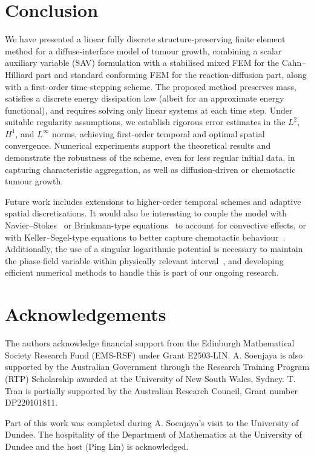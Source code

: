 \documentclass[11pt, reqno]{amsart}
\theoremstyle{definition}
\numberwithin{equation}{section}
\begin{document}
\section{Conclusion}\label{sec:conclusion}

We have presented a linear fully discrete structure-preserving finite element method for a diffuse-interface model of tumour growth, combining a scalar auxiliary variable (SAV) formulation with a stabilised mixed FEM for the Cahn--Hilliard part and standard conforming FEM for the reaction-diffusion part, along with a first-order time-stepping scheme. The proposed method preserves mass, satisfies a discrete energy dissipation law (albeit for an approximate energy functional), and requires solving only linear systems at each time step. Under suitable regularity assumptions, we establish rigorous error estimates in the $L^2$, $H^1$, and $L^\infty$ norms, achieving first-order temporal and optimal spatial convergence. Numerical experiments support the theoretical results and demonstrate the robustness of the scheme, even for less regular initial data, in capturing characteristic aggregation, as well as diffusion-driven or chemotactic tumour growth.

Future work includes extensions to higher-order temporal schemes and adaptive spatial discretisations. It would also be interesting to couple the model with Navier--Stokes~\cite{LamWu18} or Brinkman-type equations~\cite{EbeGar19} to account for convective effects, or with Keller--Segel-type equations to better capture chemotactic behaviour~\cite{RocSchSig23}. Additionally, the use of a singular logarithmic potential is necessary to maintain the phase-field variable within physically relevant interval~\cite{ColGilSigSpr23}, and developing efficient numerical methods to handle this is part of our ongoing research.



\section*{Acknowledgements}
The authors acknowledge financial support from the Edinburgh Mathematical Society Research Fund (EMS-RSF) under Grant E2503-LIN. A. Soenjaya is also supported by the Australian Government through the Research Training Program (RTP) Scholarship awarded at the University of New South Wales, Sydney. T. Tran is partially supported by the Australian Research Council, Grant number DP220101811.

Part of this work was completed during A. Soenjaya's visit to the University of Dundee. The hospitality of the Department of Mathematics at the University of Dundee and the host (Ping Lin) is acknowledged.
\end{document}
